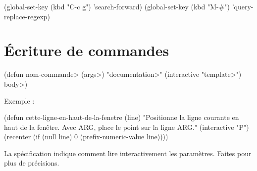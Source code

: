 \beginexample%
(global-set-key (kbd "C-c g") 'search-forward)
(global-set-key (kbd "M-\#") 'query-replace-regexp)
\endexample

\section{\'Ecriture de commandes}

\beginexample%
(defun \<nom-commande> (\<args>)
  "\<documentation>"
  (interactive "\<template>")
  \<body>)
\endexample

Exemple :

\beginexample%
(defun cette-ligne-en-haut-de-la-fenetre (line)
  "Positionne la ligne courante en haut de la fen\^etre.
Avec ARG, place le point sur la ligne ARG."
  (interactive "P")
  (recenter (if (null line)
                0
              (prefix-numeric-value line))))
\endexample

La sp\'ecification  indique comment lire
interactivement les param\`etres. Faites  pour
plus de pr\'ecisions.

\copyrightnotice

\bye

